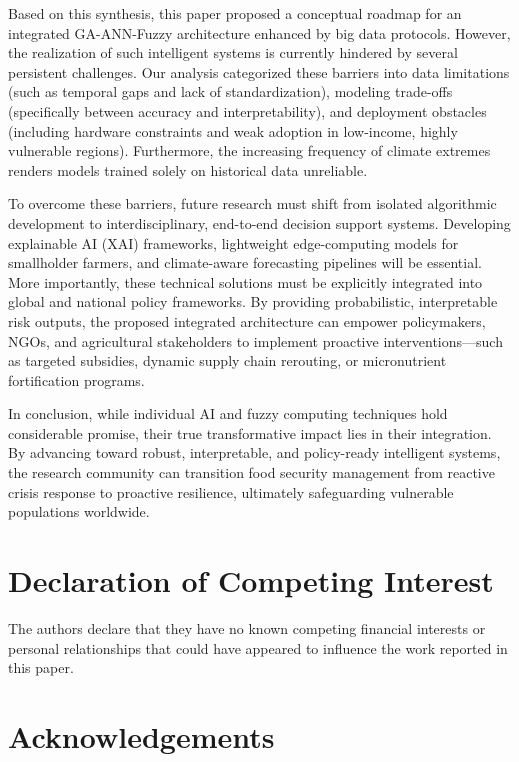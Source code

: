 \documentclass[preprint,12pt]{elsarticle}
\begin{document}
	Based on this synthesis, this paper proposed a conceptual roadmap for an
	integrated GA-ANN-Fuzzy architecture enhanced by big data protocols.
	However, the realization of such intelligent systems is currently
	hindered by several persistent challenges. Our analysis categorized
	these barriers into data limitations (such as temporal gaps and lack of
	standardization), modeling trade-offs (specifically between accuracy and
	interpretability), and deployment obstacles (including hardware
	constraints and weak adoption in low-income, highly vulnerable regions).
	Furthermore, the increasing frequency of climate extremes renders models
	trained solely on historical data unreliable.
	
	To overcome these barriers, future research must shift from isolated
	algorithmic development to interdisciplinary, end-to-end decision
	support systems. Developing explainable AI (XAI) frameworks, lightweight
	edge-computing models for smallholder farmers, and climate-aware
	forecasting pipelines will be essential. More importantly, these
	technical solutions must be explicitly integrated into global and
	national policy frameworks. By providing probabilistic, interpretable
	risk outputs, the proposed integrated architecture can empower
	policymakers, NGOs, and agricultural stakeholders to implement proactive
	interventions---such as targeted subsidies, dynamic supply chain
	rerouting, or micronutrient fortification programs.
	
	In conclusion, while individual AI and fuzzy computing techniques hold
	considerable promise, their true transformative impact lies in their
	integration. By advancing toward robust, interpretable, and policy-ready
	intelligent systems, the research community can transition food security
	management from reactive crisis response to proactive resilience,
	ultimately safeguarding vulnerable populations worldwide.
	
	\section*{Declaration of Competing Interest}
	
	The authors declare that they have no known competing financial
	interests or personal relationships that could have appeared to
	influence the work reported in this paper.
	
	\section*{Acknowledgements}
	
\end{document}

